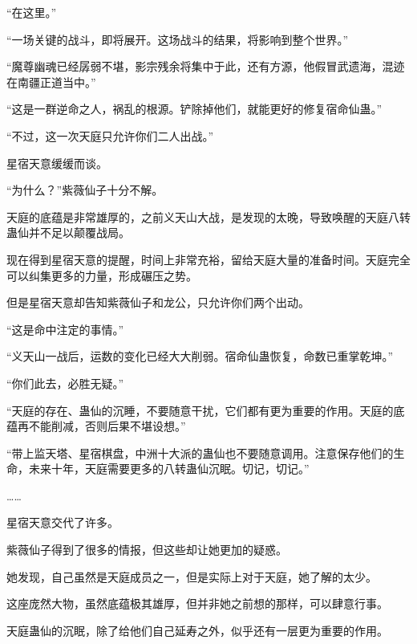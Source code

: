\begin{this_body}
“在这里。”

“一场关键的战斗，即将展开。这场战斗的结果，将影响到整个世界。”

“魔尊幽魂已经孱弱不堪，影宗残余将集中于此，还有方源，他假冒武遗海，混迹在南疆正道当中。”

“这是一群逆命之人，祸乱的根源。铲除掉他们，就能更好的修复宿命仙蛊。”

“不过，这一次天庭只允许你们二人出战。”

星宿天意缓缓而谈。

“为什么？”紫薇仙子十分不解。

天庭的底蕴是非常雄厚的，之前义天山大战，是发现的太晚，导致唤醒的天庭八转蛊仙并不足以颠覆战局。

现在得到星宿天意的提醒，时间上非常充裕，留给天庭大量的准备时间。天庭完全可以纠集更多的力量，形成碾压之势。

但是星宿天意却告知紫薇仙子和龙公，只允许你们两个出动。

“这是命中注定的事情。”

“义天山一战后，运数的变化已经大大削弱。宿命仙蛊恢复，命数已重掌乾坤。”

“你们此去，必胜无疑。”

“天庭的存在、蛊仙的沉睡，不要随意干扰，它们都有更为重要的作用。天庭的底蕴再不能削减，否则后果不堪设想。”

“带上监天塔、星宿棋盘，中洲十大派的蛊仙也不要随意调用。注意保存他们的生命，未来十年，天庭需要更多的八转蛊仙沉眠。切记，切记。”

……

星宿天意交代了许多。

紫薇仙子得到了很多的情报，但这些却让她更加的疑惑。

她发现，自己虽然是天庭成员之一，但是实际上对于天庭，她了解的太少。

这座庞然大物，虽然底蕴极其雄厚，但并非她之前想的那样，可以肆意行事。

天庭蛊仙的沉眠，除了给他们自己延寿之外，似乎还有一层更为重要的作用。

\end{this_body}

